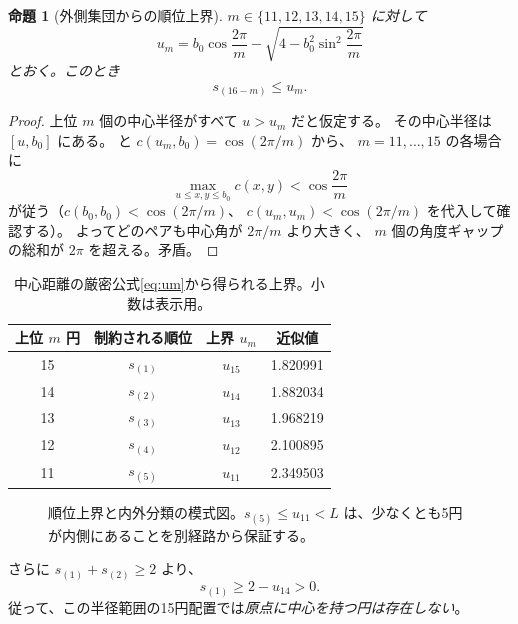 \documentclass[11pt,a4paper]{article}
\theoremstyle{JPthm}
\newtheorem{proposition}[theorem]{命題}
\theoremstyle{definition}
\newcommand{\bzero}{b_{0}}
\begin{document}
\begin{proposition}[外側集団からの順位上界]\label{prop:orderupper}
$m\in\{11,12,13,14,15\}$ に対して
\begin{equation}\label{eq:um}
 u_m=\bzero\cos\frac{2\pi}{m}
 -\sqrt{4-\bzero^2\sin^2\frac{2\pi}{m}}
\end{equation}
とおく。このとき
\[
 \boxed{s_{(16-m)}\le u_m}.
\]
\end{proposition}
\begin{proof}
上位 $m$ 個の中心半径がすべて $u>u_m$ だと仮定する。
その中心半径は $[u,\bzero]$ にある。 と
$c(u_m,\bzero)=\cos(2\pi/m)$ から、
$m=11,\ldots,15$ の各場合に
\[
 \max_{u\le x,y\le\bzero}c(x,y)<\cos\frac{2\pi}{m}
\]
が従う（$c(\bzero,\bzero)<\cos(2\pi/m)$、
$c(u_m,u_m)<\cos(2\pi/m)$ を代入して確認する）。
よってどのペアも中心角が $2\pi/m$ より大きく、
$m$ 個の角度ギャップの総和が $2\pi$ を超える。矛盾。
\end{proof}
\begin{table}[H]\centering\small
\caption{中心距離の厳密公式\eqref{eq:um}から得られる上界。小数は表示用。}
\begin{tabular}{@{}cccc@{}}\toprule
上位 $m$ 円 & 制約される順位 & 上界 $u_m$ & 近似値\\\midrule
15 & $s_{(1)}$ & $u_{15}$ & 1.820991\\
14 & $s_{(2)}$ & $u_{14}$ & 1.882034\\
13 & $s_{(3)}$ & $u_{13}$ & 1.968219\\
12 & $s_{(4)}$ & $u_{12}$ & 2.100895\\
11 & $s_{(5)}$ & $u_{11}$ & 2.349503\\\bottomrule
\end{tabular}
\end{table}
\begin{figure}[H]\centering
{}
\caption{順位上界と内外分類の模式図。$s_{(5)}\le u_{11}<L$ は、少なくとも5円が内側にあることを別経路から保証する。}
\end{figure}
さらに $s_{(1)}+s_{(2)}\ge2$ より、
\begin{equation}\label{eq:firstpositive}
 s_{(1)}\ge2-u_{14}>0.
\end{equation}
従って、この半径範囲の15円配置では\emph{原点に中心を持つ円は存在しない}。
\end{document}
